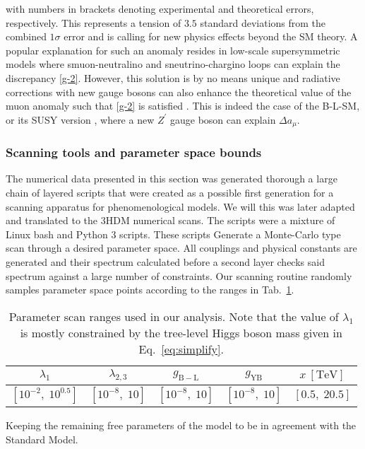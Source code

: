 with numbers in brackets denoting experimental and theoretical errors, respectively. This represents a tension of $3.5$ standard deviations from the combined $1 \sigma$ error and is calling for new physics effects beyond the SM theory. { \color{gray} A popular explanation for such an anomaly resides in low-scale supersymmetric models \cite{Belyaev:2016oxy,Grifols:1982vx,Ellis:1982by,Kosower:1983yw,Yuan:1984ww,Romao:1984pn,Cho:2011rk,Okada:2013ija,Endo:2013lva,Gogoladze:2014cha,Wang:2015rli} where smuon-neutralino and sneutrino-chargino loops can explain the discrepancy \eqref{g-2}.}  However, this solution is by no means unique and radiative corrections with new gauge bosons can also enhance the theoretical value of the muon anomaly such that \eqref{g-2} is satisfied \cite{Czarnecki:2001pv}. This is indeed the case of the B-L-SM, or its SUSY version \cite{Khalil:2015wua,Yang:2018guw}, where a new $Z^\prime$ gauge boson can explain $\Delta a_\mu$. 


\subsubsection{Scanning tools and parameter space bounds}

The numerical data presented in this section was generated thorough a large chain of layered scripts that were created as a possible first generation for a scanning apparatus for phenomenological models. We will this was later adapted and translated to the 3HDM numerical scans. The scripts were a mixture of Linux bash and Python 3 scripts. These scripts Generate a Monte-Carlo type scan through a desired parameter space. All couplings and physical constants are generated and their spectrum calculated before a second layer checks said spectrum against a large number of constraints. 
%
Our scanning routine randomly samples parameter space points according to the ranges in Tab.~\ref{tab:scan}.
%
\begin{table}[htb!]
	\begin{center}
		\begin{tabular}{ccccc}
			\toprule                     
			$\lambda_{1}$ & $\lambda_{2,3}$ & $g_{\mathrm{B-L}}$ & $g_{\mathrm{YB}}$ & $x~{\mathrm{[TeV]}}$  
			\\       
						\midrule 
			$\left[10^{-2},\; 10^{0.5}
			\right]$ 			    							& $\left[10^{-8},\; 10
			\right]$ 			    							& $\left[10^{-8},\; 10
			\right]$		& $\left[10^{-8},\; 10
			\right]$	&	$\left[0.5,\; 20.5
			\right]$ 	\\
			\bottomrule
		\end{tabular}  
		\caption{Parameter scan ranges used in our analysis. Note that the value of $\lambda_1$ is mostly constrained by the tree-level Higgs boson mass given in Eq.~\eqref{eq:simplify}. 
		}
		\label{tab:scan}
	\end{center}
\end{table}
%  
Keeping the remaining free parameters of the model to be in agreement with the Standard Model.

